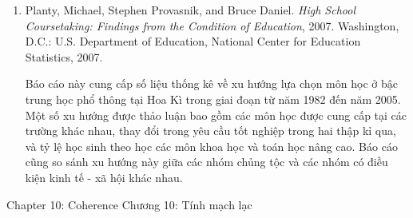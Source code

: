 {{\begin{enumerate}
          \par\noindent\hspace*{1em} Công trình này là báo cáo nghiên cứu so sánh bảy trường trung học công lập, trong đó bốn trường cho thấy sự tiến bộ vượt bậc của học sinh bước vào trung học với mức độ học tập kém hơn đáng kể so với bạn bè cùng trang lứa. Bốn trường điển hình này được so sánh với các trường có mức tăng trưởng trung bình. Các trường trong nghiên cứu có đặc điểm dân số tương tự nhau, với đa số học sinh thuộc nhóm thiểu số và có hoàn cảnh kinh tế - xã hội khó khăn. Nghiên cứu làm rõ cách tiếp cận đã được áp dụng tại các trường đạt kết quả thành công.\vspace{.35\baselineskip}

        \item Planty, Michael, Stephen Provasnik, and Bruce Daniel. \emph{High School Coursetaking: Findings from the Condition of Education}, 2007. Washington, D.C.: U.S. Department of Education, National Center for Education Statistics, 2007.\vspace{.25\baselineskip}

          \par\noindent\hspace*{1em} Báo cáo này cung cấp số liệu thống kê về xu hướng lựa chọn môn học ở bậc trung học phổ thông tại Hoa Kì trong giai đoạn từ năm 1982 đến năm 2005. Một số xu hướng được thảo luận bao gồm các môn học được cung cấp tại các trường khác nhau, thay đổi trong yêu cầu tốt nghiệp trong hai thập kỉ qua, và tỷ lệ học sinh theo học các môn khoa học và toán học nâng cao. Báo cáo cũng so sánh xu hướng này giữa các nhóm chủng tộc và các nhóm có điều kiện kinh tế - xã hội khác nhau.
      \end{enumerate}}
  }{\NOTE{}}

\ParallelSection
  {Chapter 10: Coherence}
  {Chương 10: Tính mạch lạc}
  {}

